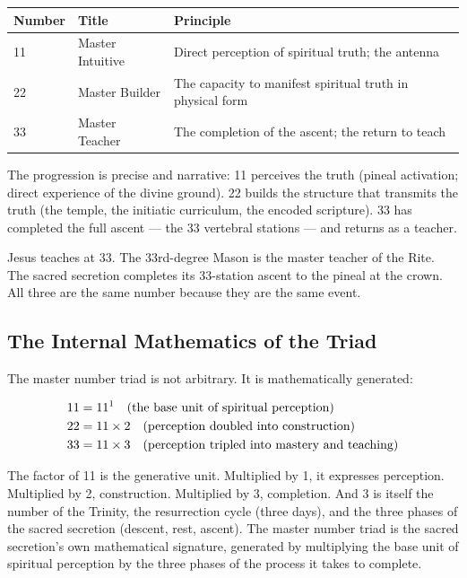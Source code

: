 \documentclass[12pt, a4paper]{article}
\begin{document}
\begin{center}
\begin{tabular}{C{2cm} C{4cm} C{6cm}}
\toprule
\textbf{Number} & \textbf{Title} & \textbf{Principle} \\
 & Master Intuitive & Direct perception of spiritual truth; the antenna \\
22 & Master Builder   & The capacity to manifest spiritual truth in physical form \\
33 & Master Teacher   & The completion of the ascent; the return to teach \\
\bottomrule
\end{tabular}
\end{center}

\vspace{1em}

The progression is precise and narrative: 11 perceives the truth (pineal
activation; direct experience of the divine ground). 22 builds the structure
that transmits the truth (the temple, the initiatic curriculum, the encoded
scripture). 33 has completed the full ascent — the 33 vertebral stations —
and returns as a teacher.

Jesus teaches at 33. The 33rd-degree Mason is the master teacher of the Rite.
The sacred secretion completes its 33-station ascent to the pineal at the
crown. All three are the same number because they are the same event.

\subsection{The Internal Mathematics of the Triad}

The master number triad is not arbitrary. It is mathematically generated:

\begin{align}
11 &= 11^1 \quad \text{(the base unit of spiritual perception)} \notag \\
22 &= 11 \times 2 \quad \text{(perception doubled into construction)} \notag \\
33 &= 11 \times 3 \quad \text{(perception tripled into mastery and teaching)} \notag
\end{align}

The factor of 11 is the generative unit. Multiplied by 1, it expresses
perception. Multiplied by 2, construction. Multiplied by 3, completion.
And 3 is itself the number of the Trinity, the resurrection cycle (three days),
and the three phases of the sacred secretion (descent, rest, ascent). The
master number triad is the sacred secretion's own mathematical signature,
generated by multiplying the base unit of spiritual perception by the three
phases of the process it takes to complete.
\end{document}
